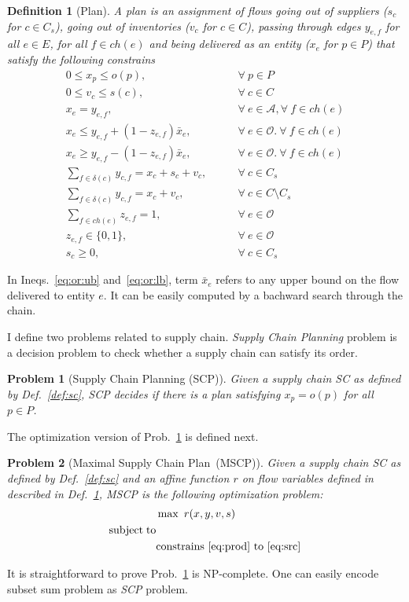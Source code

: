 \documentclass[a4paper]{article}
\newtheorem{problem}{Problem}
\newtheorem{definition}{Definition}
\newcommand{\ands}{\mathcal{A}}
\newcommand{\ors}{\mathcal{O}}
\newcommand{\SCP}{\textsl{SCP}}
\newcommand{\SC}{\textsl{SC}}
\newcommand{\chain}{\mathit{ch}}
\begin{document}
\begin{definition}[Plan]\label{def:plan}
  A \emph{plan} is an assignment of flows going out of suppliers ($s_c$ for
  $c\in C_s$), going out of inventories ($v_c$ for $c\in C$), passing through
  edges $y_{e,f}$ for all $e\in E$, for all $f\in\chain(e)$ and being delivered
  as an entity ($x_e$ for $p\in P$) that satisfy the following constrains
  \begin{align}
    0\le x_p\le o(p),&\qquad\forall~p\in P\label{eq:prod}\\
    0\le v_c\le s(c),&\qquad\forall~c\in C\\
    x_e=y_{e,f},&\qquad\forall~e\in\ands, \forall~f\in\chain(e)\\
    x_e\le
    y_{e,f}+(1-z_{e,f})\bar{x}_{e},&\qquad\forall~e\in\ors.~\forall~f\in\chain(e)\label{eq:or:ub}\\
    x_e\ge
    y_{e,f}-(1-z_{e,f})\bar{x}_{e},&\qquad\forall~e\in\ors.~\forall~f\in\chain(e)\label{eq:or:lb}\\
    \sum_{f\in\delta(c)}y_{c,f}=x_c+s_c+v_c,&\qquad\forall~c\in C_s\\
    \sum_{f\in\delta(c)}y_{c,f}=x_c+v_c,&\qquad\forall~c\in C\setminus C_s\\
    \sum_{f\in\chain(e)}z_{e,f}=1,&\qquad\forall~e\in\ors\\
    z_{e,f}\in\{0,1\},&\qquad\forall~e\in\ors\\
    s_c\ge 0,&\qquad\forall~c\in C_s\label{eq:src}
  \end{align}
\end{definition}
In Ineqs.~\eqref{eq:or:ub} and~\eqref{eq:or:lb}, term $\bar{x}_e$ refers to
any upper bound on the flow delivered to entity $e$. It can be easily computed
by a bachward search through the chain.
 
I define two problems related to supply chain. \emph{Supply Chain
  Planning} problem is a decision problem to check whether a supply
chain can satisfy its order.
\begin{problem}[Supply Chain Planning (SCP)]\label{prob:scp}
  Given a supply chain \SC{} as defined by Def.~\ref{def:sc}, \SCP{} decides
  if there is a plan satisfying $x_p=o(p)$ for all $p\in P$.
\end{problem}
The optimization version of Prob.~\ref{prob:scp} is defined next.
\begin{problem}[Maximal Supply Chain Plan~(MSCP)]\label{prob:mscp}
  Given a supply chain \SC{} as defined by Def.~\ref{def:sc} and an affine
  function $r$ on flow variables defined in described in
  Def.~\ref{def:plan}, MSCP is the following optimization problem:
  \begin{align*}
    &\max~r(x,y,v,s)\\
\mathrm{subject}\;\mathrm{to}&\\
&\mathrm{constrains}~\eqref{eq:prod}~\mathrm{to}~\eqref{eq:src}
  \end{align*}
\end{problem}
It is straightforward to prove Prob.~\ref{prob:scp} is
NP-complete. One can easily encode subset sum problem as \SCP{}
problem.
\end{document}
